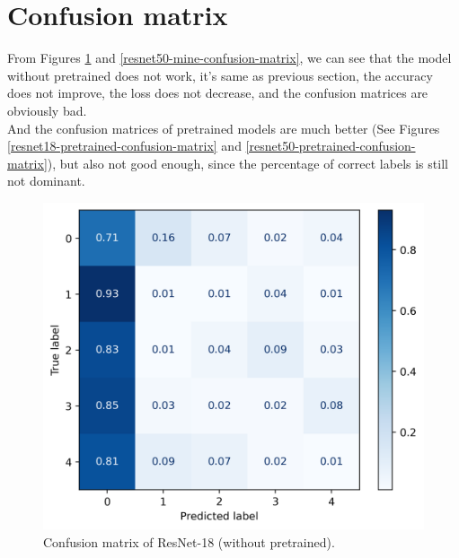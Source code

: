 \section{Confusion matrix}
\indent
	From Figures \ref{resnet18-mine-confusion-matrix} and \ref{resnet50-mine-confusion-matrix}, we can see that the model without pretrained does not work, 
	it's same as previous section, the accuracy does not improve, the loss does not decrease, and the confusion matrices are obviously bad. \\
	And the confusion matrices of pretrained models are much better (See Figures \ref{resnet18-pretrained-confusion-matrix} and \ref{resnet50-pretrained-confusion-matrix}), but 
	also not good enough, since the percentage of correct labels is still not dominant.

	\begin{figure}[H]
		\centering
		\includegraphics[scale=0.8]{img/resnet18_confusion_matrix_mine.png}
		\caption{Confusion matrix of ResNet-18 (without pretrained).}
		\label{resnet18-mine-confusion-matrix}
	\end{figure}
